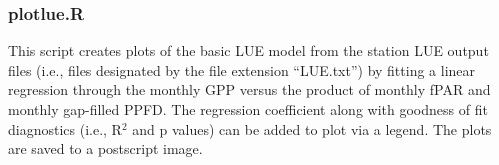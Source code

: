 \subsubsection{plot\textunderscore lue.R}
\label{sec:modelplr}
This script creates plots of the basic LUE model from the station LUE output files (i.e., files designated by the file extension ``\textunderscore LUE.txt'') by fitting a linear regression through the monthly GPP versus the product of monthly fPAR and monthly gap-filled PPFD.  
The regression coefficient along with goodness of fit diagnostics (i.e., R$^2$ and p values) can be added to plot via a legend.  
The plots are saved to a postscript image.

